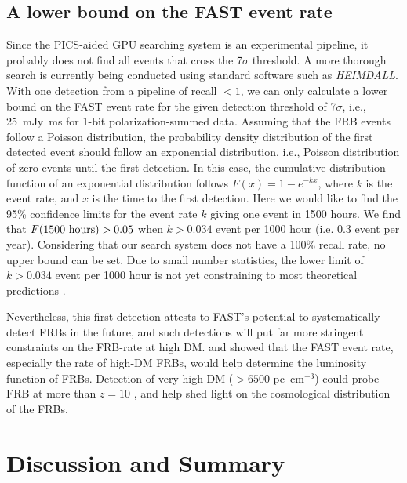 \subsection{A lower bound on the FAST event rate}
Since the PICS-aided GPU searching system is an experimental pipeline, it probably does not find all events that cross the 7$\sigma$ threshold. A more thorough search is currently being conducted using standard software such as {\it HEIMDALL}.
With one detection from a pipeline of recall $<1$, we can only calculate a lower bound on the FAST event rate for the given detection threshold of 7$\sigma$, i.e., 25~mJy~ms for 1-bit polarization-summed data. 
Assuming that the FRB events follow a Poisson distribution, the probability density distribution of the first detected event should follow an exponential distribution, i.e., Poisson distribution of zero events until the first detection. 
In this case, the cumulative distribution function of an exponential
distribution follows $F(x) =1 - e^{-k x} $, where $k$ is the
event rate, and $x$ is the time to the first detection. 
Here we would like to find the 95\% confidence limits for the event rate
$k$ giving one event in 1500 hours. We find that $F(1500\ \rm hours) > 0.05$ when $k > 0.034$ event per 1000 hour (i.e. 0.3 event per year).
Considering that our search system does not have a 100\% recall rate, no upper bound can be set. 
Due to small number statistics, the lower limit of $k > 0.034 $ event per 1000 hour is not yet constraining to most theoretical predictions \citep{lhz+17, lllz18, lml+20}. 

Nevertheless, this first detection attests to FAST's potential to systematically detect FRBs in the future, and such detections will put far more stringent constraints on the FRB-rate at high DM.
\citet{lor18} and \citet{zhang18} showed that the FAST event rate, especially the rate of high-DM FRBs, would help determine the luminosity function of FRBs.
Detection of very high DM ($> 6500$ pc~cm$^{-3}$) could probe FRB at more than $z=10$ \citep{zhang18}, and help shed light on the cosmological distribution of the FRBs.

\section{Discussion and Summary}

